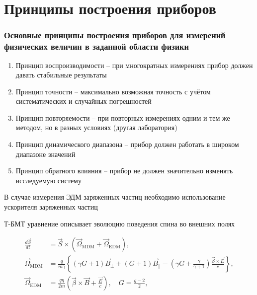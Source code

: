 \section{Принципы построения приборов} %

\begin{frame}
 \frametitle{Основные принципы построения приборов для измерений физических величин в заданной области физики}

\begin{enumerate}
\item Принцип воспроизводимости – при многократных измерениях прибор должен давать стабильные результаты
\item Принцип точности – максимально возможная точность с учётом систематических и случайных погрешностей
\item Принцип повторяемости – при повторных измерениях одним и тем же методом, но в разных условиях (другая лаборатория)
\item Принцип динамического диапазона – прибор должен работать в широком диапазоне значений
\item Принцип обратного влияния – прибор не должен значительно изменять исследуемую систему

\end{enumerate}
\end{frame}

\begin{frame}
	
	\par В случае измерения ЭДМ заряженных частиц необходимо использование ускорителя заряженных частиц
	\
	\par Т-БМТ уравнение описывает эволюцию поведения спина во внешних полях
	
		\begin{align} \label{eq:T-BMT}
			\frac{{d \vec{S}}}{d t} &=\vec{S} \times\left(\vec{\Omega}_{\textrm{MDM}}+\vec{\Omega}_{\textrm{EDM}}\right), \nonumber\\
			\vec{\Omega}_{\textrm{MDM}}&=\frac{q}{m \gamma}\left\{(\gamma G+1)\vec{B}_{\perp}+(G+1)\vec{B}_{\parallel}-\left(\gamma G+\frac{\gamma}{\gamma+1}\right) \frac{\vec{\beta} \times \vec{E}}{c}\right\}, \\
			\vec{\Omega}_{\textrm{EDM}}&=\frac{q \eta}{2 m}\left(\vec{\beta} \times \vec{B}+\frac{\vec{E}}{c}\right), \quad G=\frac{g-2}{2},\nonumber
		\end{align}
	
\end{frame}

